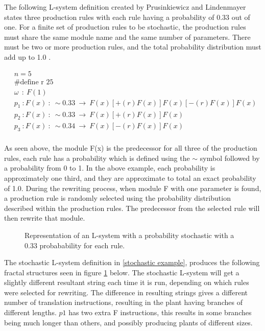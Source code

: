 The following L-system definition created by Prusinkiewicz and Lindenmayer states three production rules with each rule having a probability of 0.33 out of one. For a finite set of production rules to be stochastic, the production rules must share the same module name and the same number of parameters. There must be two or more production rules, and the total probability distribution must add up to 1.0 \cite{prusinkiewicz2012algorithmic}.

\begin{equation} \label{stochastic example}
\begin{aligned}
	&n=5\\
	&\text{\#define r 25}\\
	&\omega~~ :~ F(1)\\
	&p_1~ :  F(x)~ :~ \sim 0.33 ~ \rightarrow~ F(x)[+(r)F(x)]F(x)[-(r)F(x)]F(x)\\
	&p_2~ :  F(x)~ :~ \sim 0.33 ~ \rightarrow~ F(x)[+(r)F(x)]F(x)\\
	&p_3~ :  F(x)~ :~ \sim 0.34 ~ \rightarrow~ F(x)[-(r)F(x)]F(x)\\
\end{aligned}
\end{equation}

\noindent
As seen above, the module F(x) is the predecessor for all three of the production rules, each rule has a probability which is defined using the $\sim$ symbol followed by a probability from 0 to  1. In the above example, each probability is approximately one third, and they are approximate to total an exact probability of 1.0. During the rewriting process, when module F with one parameter is found, a production rule is randomly selected using the probability distribution described within the production rules. The predecessor from the selected rule will then rewrite that module.

\begin{figure}[htbp]
	{\centering
		\vspace{7px}
		\setlength{\fboxrule}{1pt}
		\caption{Representation of an L-system with a probability stochastic with a 0.33 probabability for each rule.} \label{stochastic diagram}
	}
\end{figure}
\FloatBarrier

\noindent
The stochastic L-system definition in \ref{stochastic example}, produces the following fractal structures seen in figure \ref{stochastic diagram} below. The stochastic L-system will get a slightly different resultant string each time it is run, depending on which rules were selected for rewriting. The difference in resulting strings gives a different number of translation instructions, resulting in the plant having branches of different lengths. $p1$ has two extra F instructions, this results in some branches being much longer than others, and possibly producing plants of different sizes. 

